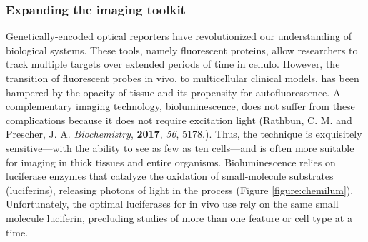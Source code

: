 \documentclass{F32}
\begin{document}
\subsubsection*{Expanding the imaging toolkit}
Genetically-encoded optical reporters have revolutionized our understanding of biological systems. These tools, namely fluorescent proteins, allow researchers to track multiple targets over extended periods of time in cellulo. However, the transition of fluorescent probes in vivo, to multicellular clinical models, has been hampered by the opacity of tissue and its propensity for autofluorescence. A complementary imaging technology, bioluminescence, does not suffer from these complications because it does not require excitation light (Rathbun, C. M. and Prescher, J. A. \textit{Biochemistry}, \textbf{2017}, \textit{56}, 5178.). Thus, the technique is exquisitely sensitive—with the ability to see as few as ten cells—and is often more suitable for imaging in thick tissues and entire organisms. Bioluminescence relies on luciferase enzymes that catalyze the oxidation of small-molecule substrates (luciferins), releasing photons of light in the process (Figure \ref{figure:chemilum}). Unfortunately, the optimal luciferases for in vivo use rely on the same small molecule luciferin, precluding studies of more than one feature or cell type at a time.
\end{document}
